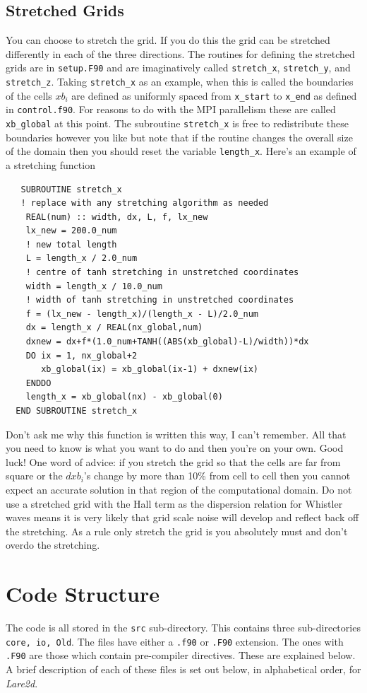\documentclass[11pt]{article}
\begin{document}
\subsection{Stretched Grids}
You can choose to stretch the grid. If you do this the grid can be stretched differently in each of the three directions. The routines for defining the stretched grids are in \texttt{setup.F90} and are imaginatively called \texttt{stretch\_x}, \texttt{stretch\_y}, and \texttt{stretch\_z}. Taking \texttt{stretch\_x} as an example, when this is called the boundaries of the cells 
$xb_i$ are defined as uniformly spaced from \texttt{x\_start} to \texttt{x\_end} as defined in \texttt{control.f90}. For reasons to do with the MPI parallelism these are called \texttt{xb\_global} at this point. The subroutine \texttt{stretch\_x} is free to redistribute these boundaries however you like but note that if the routine changes the overall size of the domain then you should reset the variable \texttt{length\_x}. Here's an example of a stretching function 
\begin{verbatim}
   SUBROUTINE stretch_x   
   ! replace with any stretching algorithm as needed
    REAL(num) :: width, dx, L, f, lx_new
    lx_new = 200.0_num                
    ! new total length
    L = length_x / 2.0_num       
    ! centre of tanh stretching in unstretched coordinates
    width = length_x / 10.0_num       
    ! width of tanh stretching in unstretched coordinates
    f = (lx_new - length_x)/(length_x - L)/2.0_num
    dx = length_x / REAL(nx_global,num)  
    dxnew = dx+f*(1.0_num+TANH((ABS(xb_global)-L)/width))*dx
    DO ix = 1, nx_global+2
       xb_global(ix) = xb_global(ix-1) + dxnew(ix)
    ENDDO
    length_x = xb_global(nx) - xb_global(0)
  END SUBROUTINE stretch_x
\end{verbatim}
Don't ask me why this function is written this way, I can't remember. All that you need to know is what you want to do and then you're on your own. Good luck! One word of advice: if you stretch the grid so that the cells are far from square or the $dxb_i$'s change by more than 10\% from cell to cell then you cannot expect an accurate solution in that region of the computational domain. Do not use a stretched grid with the Hall term as the dispersion relation for Whistler waves means it is very likely that grid scale noise will develop and reflect back off the stretching. As a rule only stretch the grid is you absolutely must and don't overdo the stretching.

\section{Code Structure}
The code is all stored in the \texttt{src} sub-directory. This contains three sub-directories \texttt{core, io, Old}. The files have either a \texttt{.f90} or \texttt{.F90} extension. The ones with \texttt{.F90} are those which contain pre-compiler directives. These are explained below. A brief description of each of these files is set out below, in alphabetical order, for {\it Lare2d}. 
\end{document}
